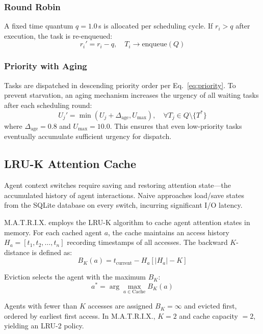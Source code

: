 \documentclass[conference]{IEEEtran}
\begin{document}
\subsubsection{Round Robin}
A fixed time quantum $q = 1.0$\,s is allocated per scheduling cycle. If $r_i > q$ after execution, the task is re-enqueued:
\begin{equation}
r_i' = r_i - q, \quad T_i \rightarrow \text{enqueue}(Q)
\end{equation}

\subsubsection{Priority with Aging}
Tasks are dispatched in descending priority order per Eq.~\eqref{eq:priority}. To prevent starvation, an aging mechanism increases the urgency of all waiting tasks after each scheduling round:
\begin{equation}
U_j' = \min(U_j + \Delta_{\text{age}}, U_{\max}), \quad \forall T_j \in Q \setminus \{T^*\}
\end{equation}
where $\Delta_{\text{age}} = 0.8$ and $U_{\max} = 10.0$. This ensures that even low-priority tasks eventually accumulate sufficient urgency for dispatch.

\subsection{LRU-K Attention Cache}

Agent context switches require saving and restoring attention state---the accumulated history of agent interactions. Naive approaches load/save states from the SQLite database on every switch, incurring significant I/O latency.

M.A.T.R.I.X. employs the LRU-K algorithm \cite{oneil1993lruk} to cache agent attention states in memory. For each cached agent $a$, the cache maintains an access history $H_a = [t_1, t_2, \ldots, t_n]$ recording timestamps of all accesses. The backward $K$-distance is defined as:
\begin{equation}
B_K(a) = t_{\text{current}} - H_a[|H_a| - K]
\end{equation}

Eviction selects the agent with the maximum $B_K$:
\begin{equation}
a^* = \arg\max_{a \in \text{Cache}} B_K(a)
\end{equation}

Agents with fewer than $K$ accesses are assigned $B_K = \infty$ and evicted first, ordered by earliest first access. In M.A.T.R.I.X., $K=2$ and cache capacity $=2$, yielding an LRU-2 policy.
\end{document}

